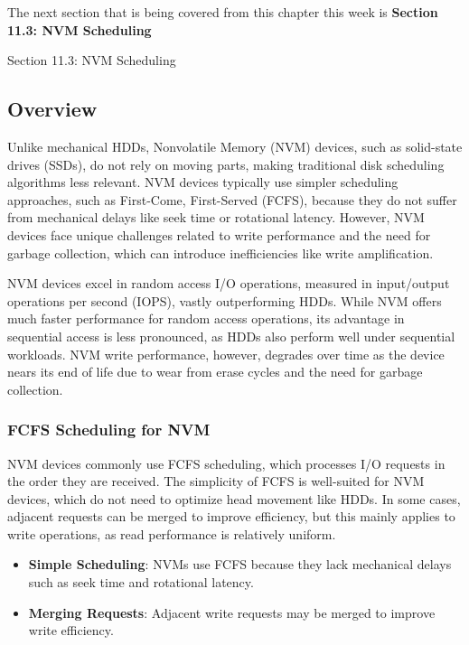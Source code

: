 The next section that is being covered from this chapter this week is \textbf{Section 11.3: NVM Scheduling}

\begin{notes}{Section 11.3: NVM Scheduling}

    \subsection*{Overview}
    
    Unlike mechanical HDDs, Nonvolatile Memory (NVM) devices, such as solid-state drives (SSDs), do not rely on moving parts, making traditional disk scheduling algorithms less relevant. NVM devices 
    typically use simpler scheduling approaches, such as First-Come, First-Served (FCFS), because they do not suffer from mechanical delays like seek time or rotational latency. However, NVM devices face 
    unique challenges related to write performance and the need for garbage collection, which can introduce inefficiencies like write amplification.
    
    NVM devices excel in random access I/O operations, measured in input/output operations per second (IOPS), vastly outperforming HDDs. While NVM offers much faster performance for random access 
    operations, its advantage in sequential access is less pronounced, as HDDs also perform well under sequential workloads. NVM write performance, however, degrades over time as the device nears its 
    end of life due to wear from erase cycles and the need for garbage collection.
    
    \subsubsection*{FCFS Scheduling for NVM}
    
    NVM devices commonly use FCFS scheduling, which processes I/O requests in the order they are received. The simplicity of FCFS is well-suited for NVM devices, which do not need to optimize head 
    movement like HDDs. In some cases, adjacent requests can be merged to improve efficiency, but this mainly applies to write operations, as read performance is relatively uniform.
    
    \begin{highlight}
    
        \begin{itemize}
            \item \textbf{Simple Scheduling}: NVMs use FCFS because they lack mechanical delays such as seek time and rotational latency.
            \item \textbf{Merging Requests}: Adjacent write requests may be merged to improve write efficiency.
        \end{itemize}
    

\end{highlight}
\end{notes}

